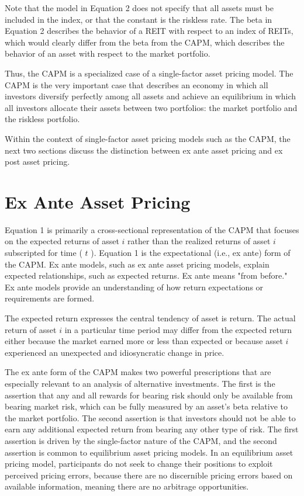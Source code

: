 \documentclass[11pt]{article}
\begin{document}
Note that the model in Equation 2 does not specify that all assets must be included in the index, or that the constant is the riskless rate. The beta in Equation 2 describes the behavior of a REIT with respect to an index of REITs, which would clearly differ from the beta from the CAPM, which describes the behavior of an asset with respect to the market portfolio.

Thus, the CAPM is a specialized case of a single-factor asset pricing model. The CAPM is the very important case that describes an economy in which all investors diversify perfectly among all assets and achieve an equilibrium in which all investors allocate their assets between two portfolios: the market portfolio and the riskless portfolio.

Within the context of single-factor asset pricing models such as the CAPM, the next two sections discuss the distinction between ex ante asset pricing and ex post asset pricing.

\section*{Ex Ante Asset Pricing}
Equation 1 is primarily a cross-sectional representation of the CAPM that focuses on the expected returns of asset $i$ rather than the realized returns of asset $i$ subscripted for time ( $t$ ). Equation 1 is the expectational (i.e., ex ante) form of the CAPM. Ex ante models, such as ex ante asset pricing models, explain expected relationships, such as expected returns. Ex ante means "from before." Ex ante models provide an understanding of how return expectations or requirements are formed.

The expected return expresses the central tendency of asset is return. The actual return of asset $i$ in a particular time period may differ from the expected return either because the market earned more or less than expected or because asset $i$ experienced an unexpected and idiosyncratic change in price.

The ex ante form of the CAPM makes two powerful prescriptions that are especially relevant to an analysis of alternative investments. The first is the assertion that any and all rewards for bearing risk should only be available from bearing market risk, which can be fully measured by an asset's beta relative to the market portfolio. The second assertion is that investors should not be able to earn any additional expected return from bearing any other type of risk. The first assertion is driven by the single-factor nature of the CAPM, and the second assertion is common to equilibrium asset pricing models. In an equilibrium asset pricing model, participants do not seek to change their positions to exploit perceived pricing errors, because there are no discernible pricing errors based on available information, meaning there are no arbitrage opportunities.
\end{document}
